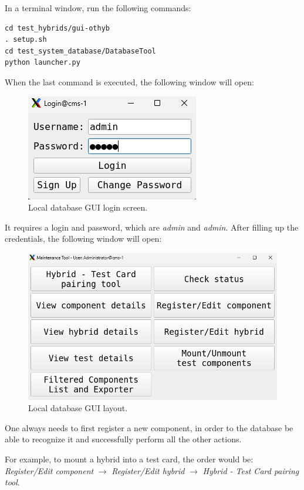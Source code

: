 \documentclass[10pt,a4paper]{article}
\begin{document}
In a terminal window, run the following commands:

\begin{framed}
\begin{verbatim}
cd test_hybrids/gui-othyb
. setup.sh 
cd test_system_database/DatabaseTool
python launcher.py
\end{verbatim}
\end{framed}

\newpage

When the last command is executed, the following window will open:

\begin{figure}[!pbth]
\centering
 \includegraphics[width=0.5\linewidth]{Pictures/scanning-GUI-login.png} 
  \caption{Local database GUI login screen.}
  \label{oi2}
\end{figure}

It requires a login and password, which are \textit{admin} and \textit{admin}. After filling up the credentials, the following window will open: 

\begin{figure}[!pbth]
\centering
 \includegraphics[width=0.7\linewidth]{Pictures/scanning-GUI.png} 
  \caption{Local database GUI layout.}
  \label{tchau2}
\end{figure}

One always needs to first register a new component, in order to the database be able to recognize it and successfully perform all the other actions.

For example, to mount a hybrid into a test card, the order would be: \textit{Register/Edit component} $\rightarrow$ \textit{Register/Edit hybrid} $\rightarrow$ \textit{Hybrid - Test Card pairing tool}.
\end{document}
